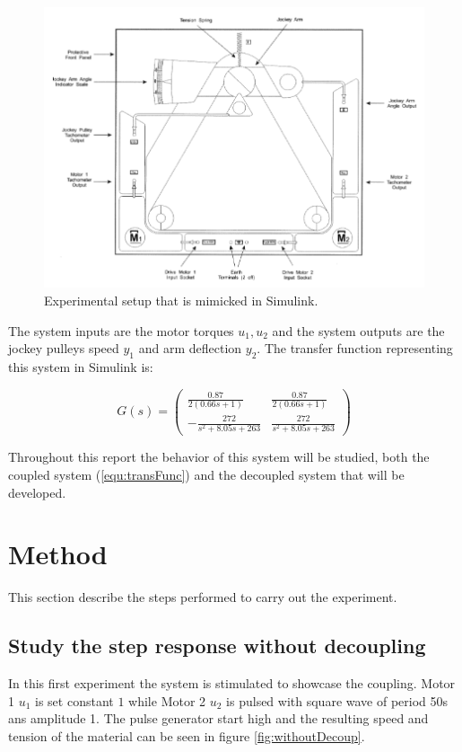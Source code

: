 \documentclass[a4paper, titlepage]{article}
\begin{document}
\begin{figure}[h!]
\center
\includegraphics[scale=0.65]{../figures/experimentSystem.png}
\caption{Experimental setup that is mimicked in Simulink.}
\label{fig:expSys}
\end{figure}

The system inputs are the motor torques $u_1, u_2$ and the system outputs are the jockey pulleys speed $y_1$ and arm deflection $y_2$.
The transfer function representing this system in Simulink is:

\begin{equation}
G(s) = 
\begin{pmatrix}
\frac{0.87}{2(0.66s + 1)} & \frac{0.87}{2(0.66s + 1)} \\[6pt]
-\frac{272}{s^2 + 8.05s + 263} & \frac{272}{s^2 + 8.05s + 263}
\end{pmatrix}
\label{equ:transFunc}
\end{equation}

Throughout this report the behavior of this system will be studied, both the coupled system (\ref{equ:transFunc}) and the decoupled system that will be developed.




\section{Method}
This section describe the steps performed to carry out the experiment.

\subsection{Study the step response without decoupling}
In this first experiment the system is stimulated to showcase the coupling.
Motor 1 $u_1$ is set constant $1$ while Motor 2 $u_2$ is pulsed with square wave of period 50s ans amplitude 1.
The pulse generator start high and the resulting speed and tension of the material can be seen in figure \ref{fig:withoutDecoup}.
\end{document}
